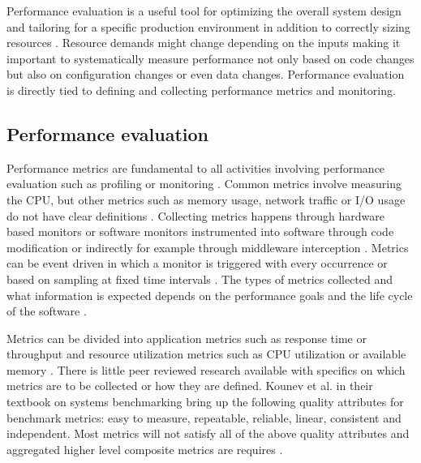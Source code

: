 Performance evaluation is a useful tool for optimizing the overall system design and tailoring for a specific production environment in addition to correctly sizing resources \parencite{brunnertPerformanceorientedDevOpsResearch2015,wallerIncludingPerformanceBenchmarks2015}. Resource demands might change depending on the inputs \parencite{brunnertPerformanceorientedDevOpsResearch2015} making it important to systematically measure performance not only based on code changes but also on configuration changes or even data changes. Performance evaluation is directly tied to defining and collecting performance metrics and monitoring.

\subsection{Performance evaluation}

Performance metrics are fundamental to all activities involving performance evaluation such as profiling or monitoring \parencite{brunnertPerformanceorientedDevOpsResearch2015}. Common metrics involve measuring the CPU, but other metrics such as memory usage, network traffic or I/O usage do not have clear definitions \parencite{brunnertPerformanceorientedDevOpsResearch2015}. Collecting metrics happens through hardware based monitors or software monitors instrumented into software through code modification or indirectly for example through middleware interception \parencite{brunnertPerformanceorientedDevOpsResearch2015}. Metrics can be event driven in which a monitor is triggered with every occurrence or based on sampling at fixed time intervals \parencite{brunnertPerformanceorientedDevOpsResearch2015}. The types of metrics collected and what information is expected depends on the performance goals and the life cycle of the software \parencite{brunnertPerformanceorientedDevOpsResearch2015}.

Metrics can be divided into application metrics such as response time or throughput and resource utilization metrics such as CPU utilization or available memory \parencite{brunnertPerformanceorientedDevOpsResearch2015}. There is little peer reviewed research available with specifics on which metrics are to be collected or how they are defined. Kounev et al. \parencite*{kounevSystemsBenchmarkingScientists2020} in their textbook on systems benchmarking bring up the following quality attributes for benchmark metrics: easy to measure, repeatable, reliable, linear, consistent and independent. Most metrics will not satisfy all of the above quality attributes and aggregated higher level composite metrics are requires \parencite{kounevSystemsBenchmarkingScientists2020}.

